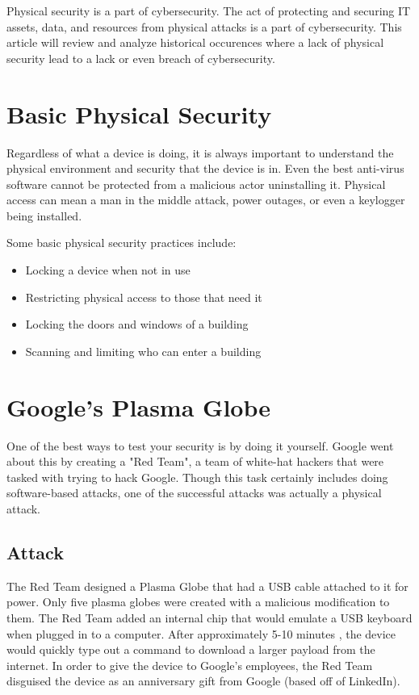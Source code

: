 \documentclass[acmlarge]{acmart}
\begin{document}
Physical security is a part of cybersecurity. The act of protecting and
securing IT assets, data, and resources from physical attacks is a part
of cybersecurity. This article will review and analyze historical
occurences where a lack of physical security lead to a lack or even breach
of cybersecurity.

\section{Basic Physical Security}
Regardless of what a device is doing, it is always important to understand
the physical environment and security that the device is in. Even the
best anti-virus software cannot be protected from a malicious actor
uninstalling it. Physical access can mean a man in the middle attack,
power outages, or even a keylogger being installed. 

Some basic physical security practices include:
\begin{itemize}
  \item Locking a device when not in use
  \item Restricting physical access to those that need it
  \item Locking the doors and windows of a building
  \item Scanning and limiting who can enter a building
\end{itemize}

\section{Google's Plasma Globe \texorpdfstring{\cite{Google01}}{}} 
One of the best ways to test your security is by doing it yourself. Google
went about this by creating a "Red Team", a team of white-hat hackers that
were tasked with trying to hack Google. Though this task certainly includes
doing software-based attacks, one of the successful attacks was actually
a physical attack.

\subsection{Attack}
The Red Team designed a Plasma Globe that had a USB cable attached to it for power.
Only five plasma globes were created with a malicious modification to them.
The Red Team added an internal chip that would emulate a USB keyboard when plugged
in to a computer. After approximately 5-10 minutes \cite{lcamtuf}, the device
would quickly type out a command to download a larger payload from the internet.
In order to give the device to Google's employees, the Red Team disguised the
device as an anniversary gift from Google (based off of LinkedIn).
\end{document}
